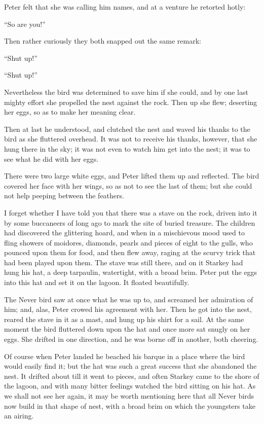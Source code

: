 Peter felt that she was calling him names, and at a venture he retorted
hotly:

``So are you!''

Then rather curiously they both snapped out the same remark:

``Shut up!''

``Shut up!''

Nevertheless the bird was determined to save him if she could, and by
one last mighty effort she propelled the nest against the rock. Then up
she flew; deserting her eggs, so as to make her meaning clear.

Then at last he understood, and clutched the nest and waved his thanks
to the bird as she fluttered overhead. It was not to receive his
thanks, however, that she hung there in the sky; it was not even to
watch him get into the nest; it was to see what he did with her eggs.

There were two large white eggs, and Peter lifted them up and
reflected. The bird covered her face with her wings, so as not to see
the last of them; but she could not help peeping between the feathers.

I forget whether I have told you that there was a stave on the rock,
driven into it by some buccaneers of long ago to mark the site of
buried treasure. The children had discovered the glittering hoard, and
when in a mischievous mood used to fling showers of moidores, diamonds,
pearls and pieces of eight to the gulls, who pounced upon them for
food, and then flew away, raging at the scurvy trick that had been
played upon them. The stave was still there, and on it Starkey had hung
his hat, a deep tarpaulin, watertight, with a broad brim. Peter put the
eggs into this hat and set it on the lagoon. It floated beautifully.

The Never bird saw at once what he was up to, and screamed her
admiration of him; and, alas, Peter crowed his agreement with her. Then
he got into the nest, reared the stave in it as a mast, and hung up his
shirt for a sail. At the same moment the bird fluttered down upon the
hat and once more sat snugly on her eggs. She drifted in one direction,
and he was borne off in another, both cheering.

Of course when Peter landed he beached his barque in a place where the
bird would easily find it; but the hat was such a great success that
she abandoned the nest. It drifted about till it went to pieces, and
often Starkey came to the shore of the lagoon, and with many bitter
feelings watched the bird sitting on his hat. As we shall not see her
again, it may be worth mentioning here that all Never birds now build
in that shape of nest, with a broad brim on which the youngsters take
an airing.

